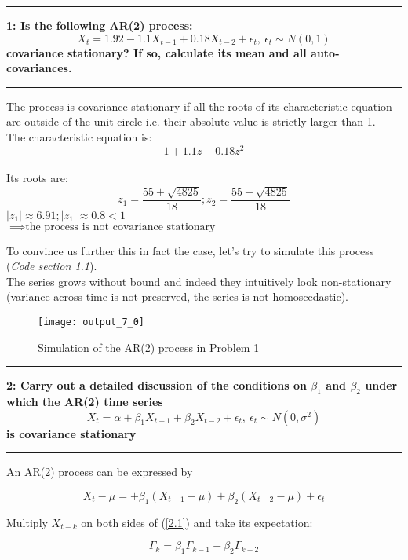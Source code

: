 \documentclass[11pt]{article}
\newcommand\question[2]{\vspace{.25in}\hrule\textbf{#1: #2}\vspace{.5em}\hrule\vspace{.10in}}
\begin{document}
\raggedright
\newcommand\NAME{Group H}
\newcommand\MEMBERS{Shenyi Mao, Yueting Zhang, Chenyu Zhao, Jose Ferreira}
\newcommand\HWNUM{1}



\question{1}{Is the following AR(2) process:	$$X_{t} = 1.92 - 1.1X_{t-1} + 0.18X_{t-2} + \epsilon_{t}, \ \epsilon_{t} \sim N(0,1)$$ covariance stationary? If so, calculate its mean and all auto-covariances.} 

The process is covariance stationary if all the roots of its characteristic equation are outside of the unit circle i.e. their absolute value is strictly larger than 1.\\

The characteristic equation is: $$1 + 1.1z - 0.18z^2$$ \\

Its roots are: 
$$z_1=\frac{55 + \sqrt{4825}}{18}; z_2 = \frac{55 - \sqrt{4825}}{18}$$
$\lvert z_1 \rvert \approx 6.91; \lvert z_1 \rvert \approx 0.8 < 1$\\ 
$\implies \text{the process is not covariance stationary}$\\
\medskip

To convince us further this in fact the case, let's try to simulate this process (\textsl{Code section 1.1}).\\
The series grows without bound and indeed they intuitively look non-stationary (variance across time is not preserved, the series is not homoscedastic).
\begin{figure}[H]
	\centering
	\texttt{[image: output\_7\_0]}
	\caption{Simulation of the AR(2) process in Problem 1}
	\label{fig:1}
\end{figure}

\question{2}{Carry out a detailed discussion of the conditions on $\beta_{1}$ and $\beta_{2}$ under which the AR(2) time series
	$$ X_t = \alpha +\beta_1X_{t-1}+\beta_2X_{t-2} + \epsilon _t, \ \epsilon _t \sim N(0,\sigma^2)$$ is covariance stationary}

An AR(2) process can be expressed by 

\begin{equation}\label{2.1}
	X_t-\mu =  +\beta_1(X_{t-1}-\mu)+\beta_2(X_{t-2}-\mu) + \epsilon _t 
\end{equation}

Multiply $X_{t-k}$ on both sides of (\ref{2.1}) and take its expectation:

$$\Gamma_k=\beta_1 \Gamma_{k-1}+\beta_2\Gamma_{k-2}$$
\end{document}
